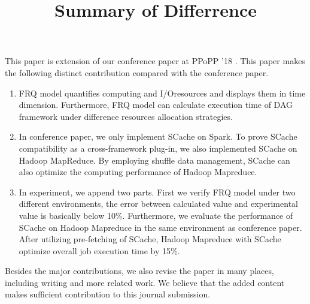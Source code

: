 \documentclass [14pt,journal,compsoc]{article}
\begin{document}
\title{Summary of Differrence}
\maketitle

This paper is extension of our conference paper at PPoPP '18 \cite{fu2018efficient}. 
This paper makes the following distinct contribution compared with the conference paper.

\begin{enumerate}
\item 
FRQ model quantifies computing and I/Oresources and displays them in time dimension. 
Furthermore, FRQ model can calculate execution time of DAG framework under difference resources allocation strategies. 
\item 
In conference paper, we only implement SCache on Spark. To prove SCache compatibility as a cross-framework plug-in, we also implemented SCache on Hadoop MapReduce. 
By employing shuffle data management, SCache can also optimize the computing performance of Hadoop Mapreduce.
\item
In experiment, we append two parts. First we verify FRQ model under two different environments, the error between calculated value and experimental value is basically below 10\%. Furthermore, we evaluate the performance of SCache on Hadoop Mapreduce in the same environment as conference paper.
After utilizing pre-fetching of SCache, Hadoop Mapreduce with SCache optimize overall job execution time by 15\%.
\end{enumerate}

Besides the major contributions, we also revise the paper in many places, including writing and more related work. We believe that the added content makes sufficient contribution to this journal submission.



\end{document}
